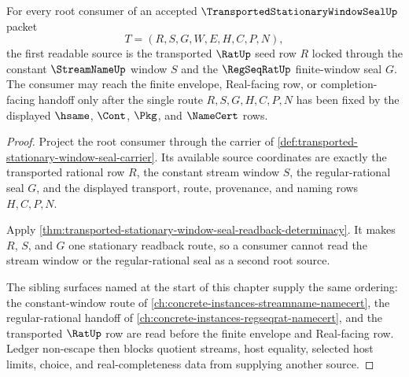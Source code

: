 \begin{theorem}
\label{thm:transported-stationary-window-seal-root-source-lock}
For every root consumer of an accepted $\TransportedStationaryWindowSealUp$ packet
$$
T=(R,S,G,W,E,H,C,P,N),
$$
the first readable source is the transported $\RatUp$ seed row $R$ locked through the constant $\StreamNameUp$ window $S$ and the $\RegSeqRatUp$ finite-window seal $G$. The consumer may reach the finite envelope, Real-facing row, or completion-facing handoff only after the single route $R,S,G,H,C,P,N$ has been fixed by the displayed $\hsame$, $\Cont$, $\Pkg$, and $\NameCert$ rows.
\end{theorem}
\begin{proof}
Project the root consumer through the carrier of \autoref{def:transported-stationary-window-seal-carrier}. Its available source coordinates are exactly the transported rational row $R$, the constant stream window $S$, the regular-rational seal $G$, and the displayed transport, route, provenance, and naming rows $H,C,P,N$.

Apply \autoref{thm:transported-stationary-window-seal-readback-determinacy}. It makes $R$, $S$, and $G$ one stationary readback route, so a consumer cannot read the stream window or the regular-rational seal as a second root source.

The sibling surfaces named at the start of this chapter supply the same ordering: the constant-window route of \autoref{ch:concrete-instances-streamname-namecert}, the regular-rational handoff of \autoref{ch:concrete-instances-regseqrat-namecert}, and the transported $\RatUp$ row are read before the finite envelope and Real-facing row. Ledger non-escape then blocks quotient streams, host equality, selected host limits, choice, and real-completeness data from supplying another source.
\end{proof}

